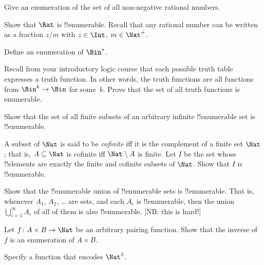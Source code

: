 \documentclass[../../../include/open-logic-section]{subfiles}
\begin{document}
\begin{prob}
Give an enumeration of the set of all non-negative rational numbers. 
\end{prob}

\begin{prob}
Show that $\Rat$ is !!{enumerable}. Recall that any rational number 
can be written as a fraction $z/m$ with $z \in \Int$, $m \in \Nat^+$.
\end{prob}

\begin{prob}
Define an enumeration of $\Bin^*$.
\end{prob}

\begin{prob}
Recall from your introductory logic course that each possible truth
table expresses a truth function. In other words, the truth functions
are all functions from $\Bin^k \to \Bin$ for some~$k$. Prove that the
set of all truth functions is enumerable.
\end{prob}

\begin{prob}
Show that the set of all finite subsets of an arbitrary infinite
!!{enumerable} set is !!{enumerable}.
\end{prob}

\begin{prob}
A subset of $\Nat$ is said to be \emph{cofinite} iff it is the
complement of a finite set $\Nat$; that is, $A \subseteq \Nat$ is
cofinite iff $\Nat\setminus A$ is finite. Let $I$ be the set whose
!!{element}s are exactly the finite and cofinite subsets of $\Nat$.
Show that $I$ is !!{enumerable}.
\end{prob}

\begin{prob}
Show that the !!{enumerable} union of !!{enumerable} sets is
!!{enumerable}. That is, whenever $A_1$, $A_2$, \dots{} are sets, and
each $A_i$ is !!{enumerable}, then the union $\bigcup_{i=1}^\infty
A_i$ of all of them is also !!{enumerable}. [NB: this is hard!]
\end{prob}

\begin{prob}
Let $f \colon A \times B \to \Nat$ be an arbitrary pairing function.
Show that the inverse of $f$ is an enumeration of $A \times B$.
\end{prob}

\begin{prob}
Specify a function that encodes $\Nat^3$.
\end{prob}
\end{document}
